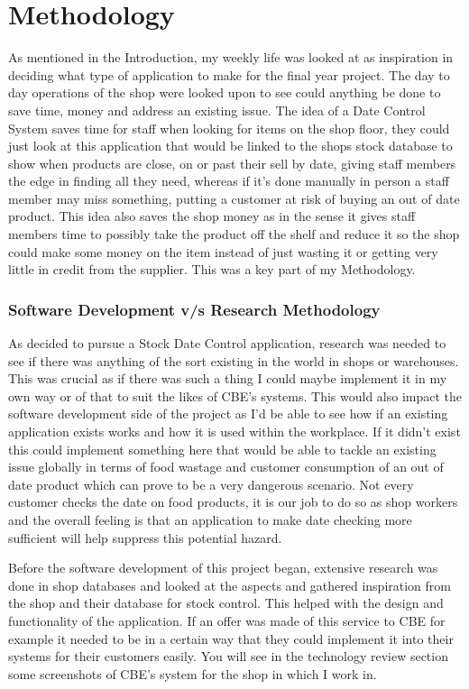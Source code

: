 \chapter{Methodology}
As mentioned in the Introduction, my weekly life was looked at as inspiration in deciding what type of application to make for the final year project. The day to day operations of the shop were looked upon to see could anything be done to save time, money and address an existing issue. The idea of a Date Control System saves time for staff when looking for items on the shop floor, they could just look at this application that would be linked to the shops stock database to show when products are close, on or past their sell by date, giving staff members the edge in finding all they need, whereas if it's done manually in person a staff member may miss something, putting a customer at risk of buying an out of date product. This idea also saves the shop money as in the sense it gives staff members time to possibly take the product off the shelf and reduce it so the shop could make some money on the item instead of just wasting it or getting very little in credit from the supplier. This was a key part of my Methodology.
\newline

\subsection{Software Development v/s Research Methodology}
As decided to pursue a Stock Date Control application, research was needed to see  if there was anything of the sort existing in the world in shops or warehouses. This was crucial as if there was such a thing I could maybe implement it in my own way or of that to suit the likes of CBE's systems. This would also impact the software development side of the project as I'd be able to see how if an existing application exists works and how it is used within the workplace. If it didn't exist this could implement something here that would be able to tackle an existing issue globally in terms of food wastage and customer consumption of an out of date product which can prove to be a very dangerous scenario. Not every customer checks the date on food products, it is our job to do so as shop workers and the overall feeling is that an application to make date checking more sufficient will help suppress this potential hazard.  
\newline

Before the software development of this project began, extensive research was done in shop databases and looked at the aspects and gathered inspiration from the shop and their database for stock control. This helped with the design and functionality of the application. If an offer was made of this service to CBE for example it needed to be in a certain way that they could implement it into their systems for their customers easily. You will see in the technology review section some screenshots of CBE's system for the shop in which I work in. 
\newline

